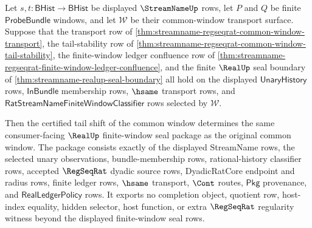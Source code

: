 \begin{theorem}
\label{thm:streamname-regseqrat-tail-stable-real-seal}
Let $s,t:\mathsf{BHist}\to\mathsf{BHist}$ be displayed $\StreamNameUp$ rows,
let $P$ and $Q$ be finite $\mathsf{ProbeBundle}$ windows, and let
$\mathcal W$ be their common-window transport surface. Suppose that the
transport row of \autoref{thm:streamname-regseqrat-common-window-transport},
the tail-stability row of
\autoref{thm:streamname-regseqrat-common-window-tail-stability}, the
finite-window ledger confluence row of
\autoref{thm:streamname-regseqrat-finite-window-ledger-confluence}, and the
finite $\RealUp$ seal boundary of
\autoref{thm:streamname-realup-seal-boundary} all hold on the displayed
$\mathsf{UnaryHistory}$ rows, $\mathsf{InBundle}$ membership rows, $\hsame$
transport rows, and
$\mathsf{RatStreamNameFiniteWindowClassifier}$ rows selected by
$\mathcal W$.

Then the certified tail shift of the common window determines the same
consumer-facing $\RealUp$ finite-window seal package as the original common
window. The package consists exactly of the displayed StreamName rows, the
selected unary observations, bundle-membership rows, rational-history
classifier rows, accepted $\RegSeqRat$ dyadic source rows, DyadicRatCore
endpoint and radius rows, finite ledger rows, $\hsame$ transport, $\Cont$
routes, $\mathsf{Pkg}$ provenance, and $\mathsf{RealLedgerPolicy}$ rows. It
exports no completion object, quotient row, host-index equality, hidden
selector, host function, or extra $\RegSeqRat$ regularity witness beyond the
displayed finite-window seal rows.
\end{theorem}
